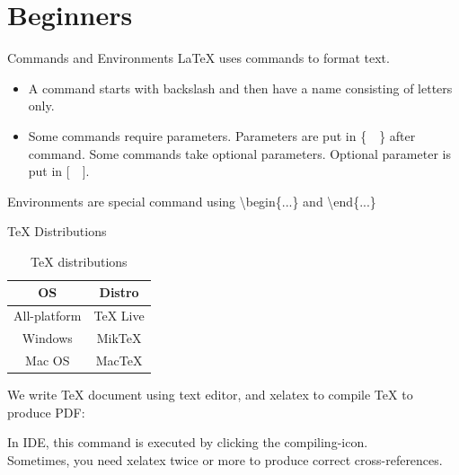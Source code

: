 \documentclass[10pt,t]{beamer}
\begin{document}
\section{Beginners}
\begin{frame}{\TeX{} Source File}
    \small
TeX},
    morekeywords={maketitle},keywordstyle=\color{red}]{einstein.tex}
\end{frame}

\begin{frame}{Commands and Environments}
    \LaTeX{} uses commands to format text.
\begin{itemize}
    \item A command starts with backslash and then have a name
        consisting of letters only.
    \item Some commands require parameters. Parameters are put in
        \{\ \ \} after command. Some commands take optional parameters.
        Optional parameter is put in [\ \ ].\\[2ex]

\end{itemize}

    Environments are special command using \textbackslash begin\{...\}
    and \textbackslash end\{...\}

\end{frame}

\begin{frame}{\TeX{} Distributions}
\begin{table}
\centering
    \caption{\TeX{} distributions}
    \begin{tabular}{cc}\hline\hline
        OS          &   Distro\\\hline
        All-platform & TeX Live\\
        Windows    & MikTeX \\
        Mac OS    & MacTeX\\\hline\hline
    \end{tabular}
\end{table}

    We write \TeX{} document using text editor, and \alert{xelatex} to compile
    \TeX{} to produce PDF:\\[2ex]

\begin{center}
\end{center}

In IDE, this command is executed by clicking the compiling-icon.
\\[1ex]
Sometimes, you need \alert{xelatex} twice or more to produce correct
cross-references.
\end{frame}
\end{document}
